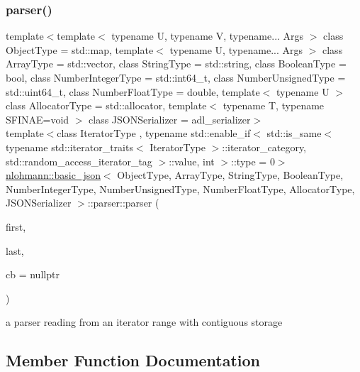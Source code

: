\subsubsection{\texorpdfstring{parser()}{parser()}\hspace{0.1cm}{\footnotesize\ttfamily [3/3]}}
{\footnotesize\ttfamily template$<$template$<$ typename U, typename V, typename... Args $>$ class Object\+Type = std\+::map, template$<$ typename U, typename... Args $>$ class Array\+Type = std\+::vector, class String\+Type  = std\+::string, class Boolean\+Type  = bool, class Number\+Integer\+Type  = std\+::int64\+\_\+t, class Number\+Unsigned\+Type  = std\+::uint64\+\_\+t, class Number\+Float\+Type  = double, template$<$ typename U $>$ class Allocator\+Type = std\+::allocator, template$<$ typename T, typename S\+F\+I\+N\+A\+E=void $>$ class J\+S\+O\+N\+Serializer = adl\+\_\+serializer$>$ \\
template$<$class Iterator\+Type , typename std\+::enable\+\_\+if$<$ std\+::is\+\_\+same$<$ typename std\+::iterator\+\_\+traits$<$ Iterator\+Type $>$\+::iterator\+\_\+category, std\+::random\+\_\+access\+\_\+iterator\+\_\+tag $>$\+::value, int $>$\+::type  = 0$>$ \\
\hyperlink{classnlohmann_1_1basic__json}{nlohmann\+::basic\+\_\+json}$<$ Object\+Type, Array\+Type, String\+Type, Boolean\+Type, Number\+Integer\+Type, Number\+Unsigned\+Type, Number\+Float\+Type, Allocator\+Type, J\+S\+O\+N\+Serializer $>$\+::parser\+::parser (\begin{DoxyParamCaption}\item[{Iterator\+Type}]{first,  }\item[{Iterator\+Type}]{last,  }\item[{const \hyperlink{classnlohmann_1_1basic__json_aecae491e175f8767c550ae3c59e180e3}{parser\+\_\+callback\+\_\+t}}]{cb = {\ttfamily nullptr} }\end{DoxyParamCaption})\hspace{0.3cm}{\ttfamily [inline]}}



a parser reading from an iterator range with contiguous storage 



\subsection{Member Function Documentation}
\mbox{\label{classnlohmann_1_1basic__json_1_1parser_aa0403d27b84db70cc5ea0ab8fd4509af}} 
